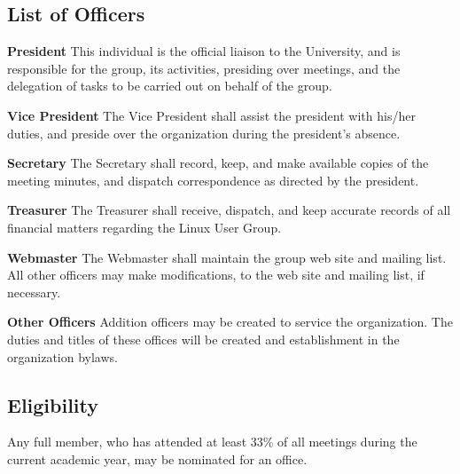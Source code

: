 \documentclass{article}
\begin{document}
\subsection{List of Officers}
\begin{description}
\item{\textbf{President}}
  This individual is the official liaison to the University, and is
  responsible for the group, its activities, presiding over meetings,
  and the delegation of tasks to be carried out on behalf of the group.
\item{\textbf{Vice President}}
  The Vice President shall assist the president with his/her duties, and
  preside over the organization during the president's absence.
\item{\textbf{Secretary}}
  The Secretary shall record, keep, and make available copies of the
  meeting minutes, and dispatch correspondence as directed by the
  president.
\item{\textbf{Treasurer}}
  The Treasurer shall receive, dispatch, and keep accurate records of
  all financial matters regarding the Linux User Group.
\item{\textbf{Webmaster}}
  The Webmaster shall maintain the group web site and mailing list. All
  other officers may make modifications, to the web site and mailing list,
  if necessary.
\item{\textbf{Other Officers}}
  Addition officers may be created to service the organization. The duties
  and titles of these offices will be created and establishment in the
  organization bylaws.
\end{description}

\subsection{Eligibility}
Any full member, who has attended at least 33\% of all meetings during
the current academic year, may be nominated for an office.
\end{document}
